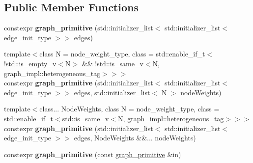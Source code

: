 \subsection*{Public Member Functions}
\begin{DoxyCompactItemize}
\item 
\mbox{\label{classsequoia_1_1maths_1_1graph__primitive_af0e00c0676a6090578ed3bbc59aea863}} 
constexpr {\bfseries graph\+\_\+primitive} (std\+::initializer\+\_\+list$<$ std\+::initializer\+\_\+list$<$ edge\+\_\+init\+\_\+type $>$$>$ edges)
\item 
\mbox{\label{classsequoia_1_1maths_1_1graph__primitive_aaa93473853499706069117a6516d8ad8}} 
{\footnotesize template$<$class N  = node\+\_\+weight\+\_\+type, class  = std\+::enable\+\_\+if\+\_\+t$<$!std\+::is\+\_\+empty\+\_\+v$<$\+N$>$ \&\& !std\+::is\+\_\+same\+\_\+v$<$\+N, graph\+\_\+impl\+::heterogeneous\+\_\+tag$>$$>$$>$ }\\constexpr {\bfseries graph\+\_\+primitive} (std\+::initializer\+\_\+list$<$ std\+::initializer\+\_\+list$<$ edge\+\_\+init\+\_\+type $>$$>$ edges, std\+::initializer\+\_\+list$<$ N $>$ node\+Weights)
\item 
\mbox{\label{classsequoia_1_1maths_1_1graph__primitive_a8d7c68391b619456ad223e9325b8ae47}} 
{\footnotesize template$<$class... Node\+Weights, class N  = node\+\_\+weight\+\_\+type, class  = std\+::enable\+\_\+if\+\_\+t$<$std\+::is\+\_\+same\+\_\+v$<$\+N, graph\+\_\+impl\+::heterogeneous\+\_\+tag$>$$>$$>$ }\\constexpr {\bfseries graph\+\_\+primitive} (std\+::initializer\+\_\+list$<$ std\+::initializer\+\_\+list$<$ edge\+\_\+init\+\_\+type $>$$>$ edges, Node\+Weights \&\&... node\+Weights)
\item 
\mbox{\label{classsequoia_1_1maths_1_1graph__primitive_aaf874b0cc6c3423055d578430f01165a}} 
constexpr {\bfseries graph\+\_\+primitive} (const \mbox{\hyperlink{classsequoia_1_1maths_1_1graph__primitive}{graph\+\_\+primitive}} \&in)
\item 
\mbox{\label{classsequoia_1_1maths_1_1graph__primitive_aa77217df765fcc3de032ada873ed7eb5}} 
$$
\end{DoxyCompactItemize}
